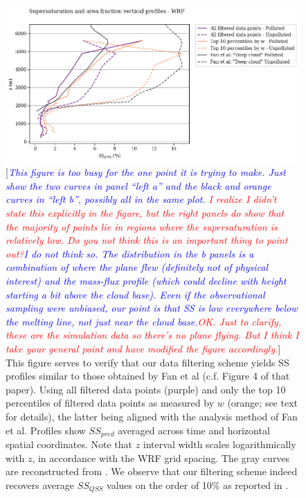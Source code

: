 \documentclass{article}
\newcommand{\drcomm}[1]{\textcolor{blue}{\textit{#1}}}
\newcommand{\klcomm}[1]{\textcolor{red}{\textit{#1}}}
\begin{document}
\begin{figure}[ht]
	\centering
	\includegraphics[width=\textwidth]{wrf/single_panel_ss_pred_vs_z_figure.png}
	\caption{[\drcomm{This figure is too busy for the one point it is trying to make. Just show the two curves in panel “left a” and the black and orange curves in “left b”, possibly all in the same plot.} \klcomm{I realize I didn't state this explicitly in the figure, but the right panels do show that the majority of points lie in regions where the supersaturation is relatively low. Do you not think this is an important thing to point out?}\drcomm{I do not think so. The distribution in the b panels is a combination of where the plane flew (definitely not of physical interest) and the mass-flux profile (which could decline with height starting a bit above the cloud base). Even if the observational sampling were unbiased, our point is that SS is low everywhere below the melting line, not just near the cloud base.}\klcomm{OK. Just to clarify, these are the simulation data so there's no plane flying. But I think I take your general point and have modified the figure accordingly.}] This figure serves to verify that our data filtering scheme yields SS profiles similar to those obtained by Fan et al (c.f. Figure 4 of that paper). Using all filtered data points (purple) and only the top 10 percentiles of filtered data points as measured by $w$ (orange; see text for details), the latter being aligned with the analysis method of Fan et al. Profiles show $SS_{pred}$ averaged across time and horizontal spatial coordinates. Note that $z$ interval width scales logarithmically with $z$, in accordance with the WRF grid spacing. The gray curves are reconstructed from \cite{Fan2018}. We observe that our filtering scheme indeed recovers average $SS_{QSS}$ values on the order of 10\% as reported in \cite{Fan2018}.}
	\label{wrfssvertprof}
\end{figure}
\end{document}
